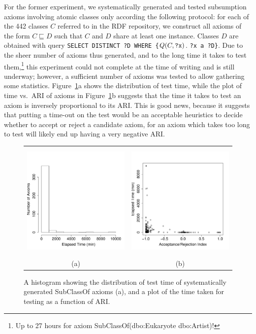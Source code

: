 \documentclass{llncs}
\begin{document}
For the former experiment, we systematically generated and tested subsumption axioms
involving atomic classes only according the following protocol:
for each of the 442 classes $C$ referred to in the RDF repository, we construct all axioms of the form
$C \sqsubseteq D$ such that $C$ and $D$ share at least one instance. Classes $D$ are obtained
with query \texttt{SELECT DISTINCT ?D WHERE \{}$Q(C, \mbox{\tt ?x})$. \texttt{?x a ?D\}}.
Due to the sheer number of axioms thus generated, and to the long time
it takes to test them,\footnote{Up to 27 hours for axiom \textsf{SubClassOf}(\textsf{dbo:Eukaryote} \textsf{dbo:Artist})!}
this experiment could not complete at the time of writing and is still underway;
however, a sufficient number of axioms was tested to allow gathering some statistics.
Figure~\ref{fig:systematic-time}a shows the distribution of test time,
while the plot of time vs.\ ARI of axioms in Figure~\ref{fig:systematic-time}b
suggests that the time it takes to test an axiom is inversely proportional to its
ARI. This is good news, because it suggests that putting a time-out
on the test would be an acceptable heuristics to decide whether to accept or reject
a candidate axiom, for an axiom which takes too long to test will likely end up
having a very negative ARI.

\begin{figure}[t]
\begin{center}
  \begin{tabular}{cc}
    \includegraphics[height=2.25in]{systematic-time-hist} &
    \includegraphics[height=2.25in]{time-ARI} \\
    (a) & (b)
  \end{tabular}
\end{center}
\caption{A histogram showing the distribution of test time of systematically generated
  \textsf{SubClassOf} axioms (a), and a plot of the time taken
  for testing as a function of ARI.}
\label{fig:systematic-time}
\end{figure}
\end{document}
